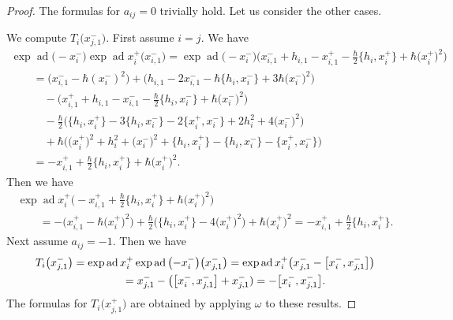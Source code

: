 \documentclass[10pt,a4paper]{amsart}
\theoremstyle{definition}
\numberwithin{equation}{section}
\DeclareMathOperator{\ad}{ad}
\begin{document}
\begin{proof}The formulas for $a_{ij}=0$ trivially hold. Let us consider the other cases.

We compute $T_i\big(x_{j,1}^-\big)$. First assume $i=j$. We have
\begin{gather*}
\exp\ad \big({-}x_i^-\big)\exp\ad x_i^+\big(x_{i,1}^-\big) = \exp\ad \big({-}x_i^-\big)\big(x_{i,1}^- + h_{i,1}-x_{i,1}^+ -\tfrac{\hbar}{2}\big\{ h_i, x_i^+\big\} + \hbar \big(x_i^+\big)^2\big)\\
\qquad {}= \big(x_{i,1}^- - \hbar(x_i^-)^2\big)+\big(h_{i,1}-2x_{i,1}^- - \hbar\big\{ h_i, x_i^- \big\} + 3\hbar \big(x_i^-\big)^2\big)\\
\qquad\quad{}-\big(x_{i,1}^+ + h_{i,1}-x_{i,1}^--\tfrac{\hbar}{2}\big\{ h_i, x_i^-\big\} + \hbar \big(x_i^-\big)^2\big)\\
\qquad\quad{}-\tfrac{\hbar}{2}\big(\big\{h_i,x_i^+\big\} - 3\big\{h_i,x_i^-\big\} - 2\big\{x_i^+,x_i^-\big\} + 2h_i^2 + 4\big(x_i^-\big)^2\big)\\
\qquad\quad{} +\hbar\big(\big(x_i^+\big)^2 + h_i^2 + \big(x_i^-\big)^2+ \big\{h_i,x_i^+\big\} - \big\{h_i,x_i^-\big\} - \big\{x_i^+,x_i^-\big\}\big)\\
\qquad{}=-x_{i,1}^+ + \tfrac{\hbar}{2}\big\{h_i,x_i^+\big\} +\hbar \big(x_i^+\big)^2.
\end{gather*}
Then we have
\begin{gather*}
\exp\ad x_i^+\big({-}x_{i,1}^+ + \tfrac{\hbar}{2}\big\{h_i,x_i^+\big\} +\hbar \big(x_i^+\big)^2\big) \\
\qquad {}= -\big( x_{i,1}^+-\hbar \big(x_i^+\big)^2 \big) + \tfrac{\hbar}{2}\big( \big\{h_i,x_i^+\big\} - 4\big(x_i^+\big)^2 \big) + \hbar \big(x_i^+\big)^2
 =-x_{i,1}^++\tfrac{\hbar}{2}\big\{h_i,x_i^+\big\}.
\end{gather*}
Next assume $a_{ij}=-1$. Then we have
\begin{gather*}
T_i\big(x_{j,1}^-\big)=\exp\ad x_i^+\exp\ad \big({-}x_i^-\big)\big(x_{j,1}^-\big) = \exp\ad x_i^+\big(x_{j,1}^- - \big[x_i^-,x_{j,1}^-\big]\big)\\
\hphantom{T_i\big(x_{j,1}^-\big)}{} = x_{j,1}^- - \big(\big[x_i^-,x_{j,1}^-\big]+x_{j,1}^-)=-\big[x_i^-,x_{j,1}^-\big]. %
\end{gather*}
The formulas for $T_i\big(x_{j,1}^+\big)$ are obtained by applying $\omega$ to these results.


\end{proof}
\end{document}
